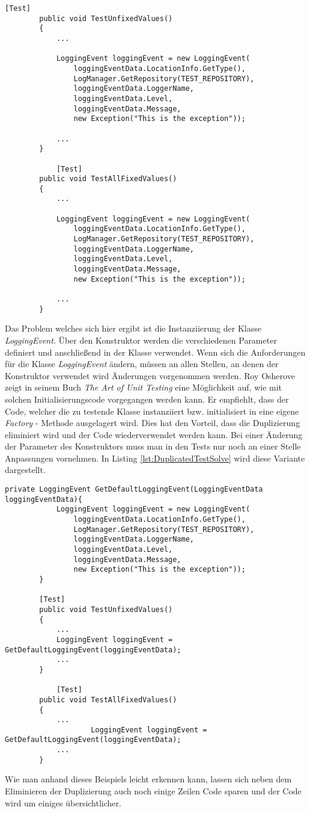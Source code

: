 \begin{lstlisting}[language={[Sharp]C}, caption=Beispiel für Duplizierung in Tests, label=lst:DuplicatedTest1]
		[Test]
		public void TestUnfixedValues()
		{
			...
			
			LoggingEvent loggingEvent = new LoggingEvent(
				loggingEventData.LocationInfo.GetType(),
				LogManager.GetRepository(TEST_REPOSITORY),
				loggingEventData.LoggerName,
				loggingEventData.Level,
				loggingEventData.Message,
				new Exception("This is the exception"));
			
			...
		}
		
			[Test]
		public void TestAllFixedValues()
		{
			...
			
			LoggingEvent loggingEvent = new LoggingEvent(
				loggingEventData.LocationInfo.GetType(),
				LogManager.GetRepository(TEST_REPOSITORY),
				loggingEventData.LoggerName,
				loggingEventData.Level,
				loggingEventData.Message,
				new Exception("This is the exception"));

			...
		}
\end{lstlisting}

\SuperPar Das Problem welches sich hier ergibt ist die Instanziierung der Klasse \textit{LoggingEvent}. Über den Konstruktor werden die verschiedenen Parameter definiert und anschließend in der Klasse verwendet. Wenn sich die Anforderungen für die Klasse \textit{LoggingEvent} ändern,  müssen an allen Stellen, an denen der Konstruktor verwendet wird Änderungen vorgenommen werden. Roy Osherove zeigt in seinem Buch \textit{The Art of Unit Testing} \cite{Osherove2013} eine Möglichkeit auf, wie mit solchen Initialisierungscode vorgegangen werden kann. Er empfiehlt, dass der Code, welcher die zu testende Klasse instanziiert bzw. initialisiert in eine eigene \textit{Factory} - Methode ausgelagert wird. Dies hat den Vorteil, dass die Duplizierung eliminiert wird und der Code wiederverwendet werden kann. Bei einer Änderung der Parameter des Konstruktors muss man in den Tests nur noch an einer Stelle Anpassungen vornehmen. In Listing \ref{lst:DuplicatedTestSolve} wird diese Variante dargestellt.


\begin{lstlisting}[language={[Sharp]C}, caption=Eliminierung der Duplizierung durch eine Factorymethode, label=lst:DuplicatedTestSolve]
		private LoggingEvent GetDefaultLoggingEvent(LoggingEventData loggingEventData){
			LoggingEvent loggingEvent = new LoggingEvent(
				loggingEventData.LocationInfo.GetType(),
				LogManager.GetRepository(TEST_REPOSITORY),
				loggingEventData.LoggerName,
				loggingEventData.Level,
				loggingEventData.Message,
				new Exception("This is the exception"));
		}

		[Test]
		public void TestUnfixedValues()
		{
			...
			LoggingEvent loggingEvent = GetDefaultLoggingEvent(loggingEventData);
			...
		}
		
			[Test]
		public void TestAllFixedValues()
		{
			...
					LoggingEvent loggingEvent = GetDefaultLoggingEvent(loggingEventData);
			...
		}
\end{lstlisting}

\SuperPar Wie man anhand dieses Beispiels leicht erkennen kann, lassen sich neben dem Eliminieren der Duplizierung auch noch einige Zeilen Code sparen und der Code wird um einiges übersichtlicher.